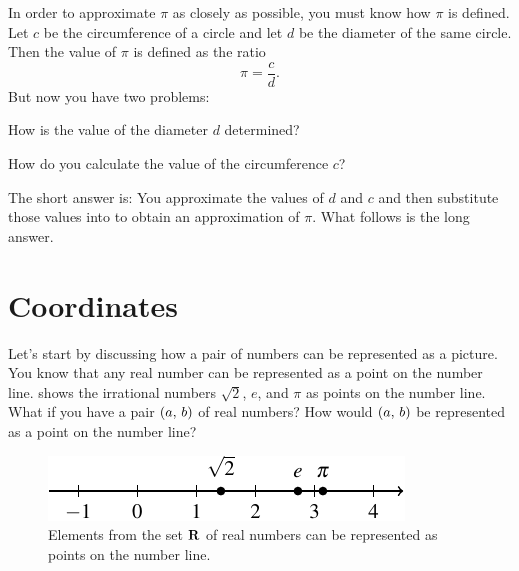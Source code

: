 \documentclass[a4paper,oneside,12pt]{article}
\begin{document}
In order to approximate $\pi$ as closely as possible, you must know
how $\pi$ is defined.  Let $c$ be the circumference of a circle and
let $d$ be the diameter of the same circle.  Then the value of $\pi$
is defined as the ratio
\begin{equation}
\label{eqn:define_pi_as_ratio_of_c_over_d}
\pi
=
\frac{c}{d}.
\end{equation}
But now you have two problems:
\begin{packedenumeral}
\item How is the value of the diameter $d$ determined?

\item How do you calculate the value of the circumference $c$?
\end{packedenumeral}
The short answer is: You approximate the values of $d$ and $c$ and
then substitute those values into
 to obtain an
approximation of $\pi$.  What follows is the long answer.



\section{Coordinates}

Let's start by discussing how a pair of numbers can be represented as
a picture.  You know that any real number can be represented as a
point on the number line.   shows the
irrational numbers $\sqrt{2}$, $e$, and $\pi$ as points on the number
line.  What if you have a pair $\left\lparen{a},\, {b}\right\rparen$ of real numbers?  How
would $\left\lparen{a},\, {b}\right\rparen$ be represented as a point on the number line?

\begin{figure}[!htbp]
\centering
\includegraphics[scale=1.1]{image/03/number-line.pdf}
\caption{%
  Elements from the set $\mathbf{R}$ of real numbers can be represented as
  points on the number line.
}
\label{fig:real_number_line}
\end{figure}
\end{document}
